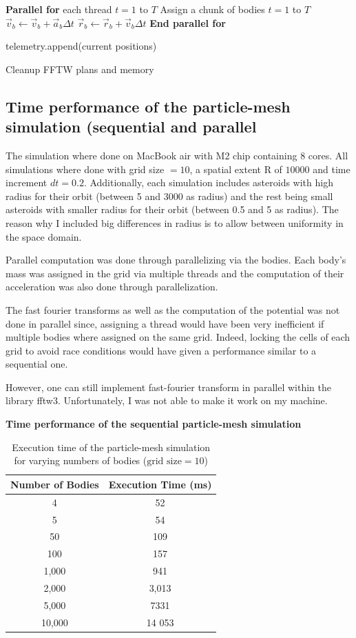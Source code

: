 \documentclass{article}
\begin{document}
\begin{algorithm}[H]
\begin{algorithmic}[1]
    \State \textbf{Parallel for} each thread $t= 1$ to $T$
        \State \quad Assign a chunk of bodies $t=1$ to $T$
                \State $\vec{v}_b \gets \vec{v}_b + \vec{a}_b \Delta t$
                \State $\vec{r}_b \gets \vec{r}_b + \vec{v}_b \Delta t$
        \EndFor
    \State \textbf{End parallel for}

    \State telemetry.append(current positions)
\EndFor

\State Cleanup FFTW plans and memory
\end{algorithmic}
\end{algorithm}
\subsection{Time performance of the particle-mesh simulation (sequential and parallel}
The simulation where done on MacBook air with M2 chip containing 8 cores.
All simulations where done with grid size $= 10$, a spatial extent R of $10 000$ and time increment $dt = 0.2$. Additionally, each simulation includes asteroids with high radius for their orbit (between 5 and 3000  as radius)  and the rest being small asteroids with smaller radius for their orbit (between 0.5 and 5 as radius). The reason why I included big differences in radius is to allow between uniformity in the space domain. 

Parallel computation was done through parallelizing via the bodies. Each body's mass was assigned in the grid via multiple threads and the computation of their acceleration was also done through parallelization. 

The fast fourier transforms as well as the computation of the potential was not done in parallel since, assigning a thread would have been very inefficient if multiple bodies where assigned on the same grid. Indeed, locking the cells of each grid to avoid race conditions would have given a performance similar to a sequential one. 

However, one can still implement fast-fourier transform in parallel within the library fftw3. Unfortunately, I was not able to make it work on my machine. 

\textbf{Time performance of the sequential particle-mesh simulation}
\begin{table}[ht]
\centering
\begin{tabular}{|c|c|}
\hline
\textbf{Number of Bodies} & \textbf{Execution Time (ms)} \\
\hline
4      & 52   \\
5      & 54   \\
50     & 109  \\
100    & 157  \\
1,000  & 941  \\
2,000  & 3,013 \\
5,000  & 7331 \\
10,000 & 14 053 \\
\hline
\end{tabular}
\caption{Execution time of the particle-mesh simulation for varying numbers of bodies ($\text{grid size} = 10$)}
\label{tab:performance}
\end{table}
\end{document}
